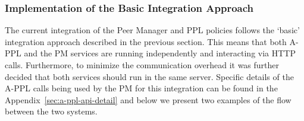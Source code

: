 \subsubsection{Implementation of the Basic Integration Approach}
The current integration of the Peer Manager and PPL policies follows the `basic' integration approach described in the previous section. This means that both A-PPL and the PM services are running independently and interacting via HTTP calls. Furthermore, to minimize the communication overhead it was further decided that both services should run in the same server. 
 Specific details of the A-PPL calls being used by the PM for this integration can be found in the Appendix~\ref{sec:a-ppl-api-detail} and below we present two examples of the flow between the two systems.
